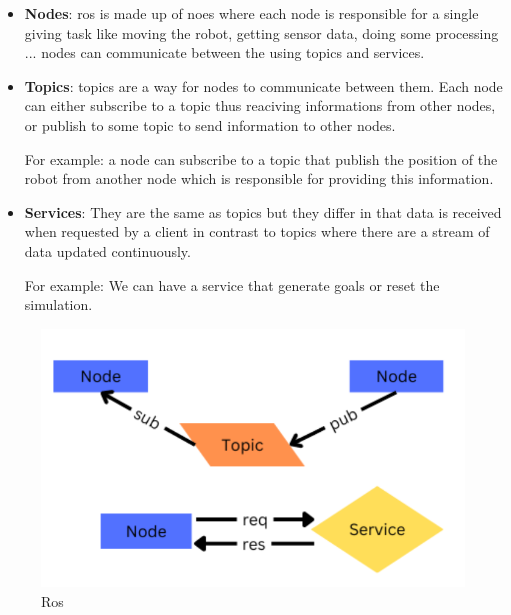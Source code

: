 \documentclass[12pt]{extarticle}
\begin{document}
 

\begin{itemize}
\item \textbf{Nodes}: ros is made up of noes where  each node     is responsible for a single giving task like moving the robot, getting sensor data, doing some processing ... \linebreak
nodes can communicate between the using topics and services.
     



\item \textbf{Topics}: topics are a way for nodes to communicate between them. Each node can either subscribe to a topic thus reaciving informations from other nodes, or publish to some topic to send information to other nodes.

For example: a node can subscribe to a topic that publish the position of the robot  from another node which is responsible for providing this information.


\item \textbf{Services}:  They are the same as topics but they differ in that data is received when requested by a client in contrast to topics where there are a stream of data updated continuously.


For example: We can have a service that generate goals or reset the simulation.



\end{itemize}
 

 
 \begin{figure}[h]  
\centering
\includegraphics[scale=0.4]{ros}
\caption[Ros]{Ros}
\end{figure}
\end{document}
